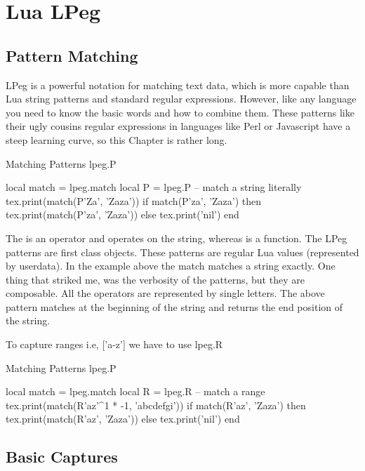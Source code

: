 \chapter{Lua LPeg}

\section{Pattern Matching}

LPeg is a powerful notation for matching text data, which is more capable than Lua string patterns and standard regular expressions. However, like any language you need to know the basic words and how to combine them. These patterns like their ugly cousins regular expressions in languages like Perl or Javascript have a steep learning curve, so this Chapter is rather long. 

\begin{texexample}{Matching Patterns lpeg.P}{}
\begin{luacode}
   local match = lpeg.match
   local P = lpeg.P -- match a string literally
   tex.print(match(P'Za', 'Zaza'))
   if match(P'za', 'Zaza') then tex.print(match(P'za', 'Zaza')) else tex.print('nil') end
\end{luacode}
\end{texexample}

The  is an operator and operates on the string, whereas  is a function. The LPeg patterns are first class objects. These patterns are regular Lua values (represented by userdata). In the example above the match matches a string exactly. One thing that striked me, was the verbosity of the patterns, but they are composable. All the operators are represented by single letters.  The above pattern matches at the beginning of the string and returns the end position of the string. 

To capture ranges i.e, ['a-z'] we have to use lpeg.R

\begin{texexample}{Matching Patterns lpeg.P}{}
\begin{luacode}
   local match = lpeg.match
   local R = lpeg.R -- match a range
   tex.print(match(R'az'^1 * -1, 'abcdefgi'))
   if match(R'az', 'Zaza') then tex.print(match(R'az', 'Zaza')) else tex.print('nil') end
\end{luacode}
\end{texexample}

\section{Basic Captures}

